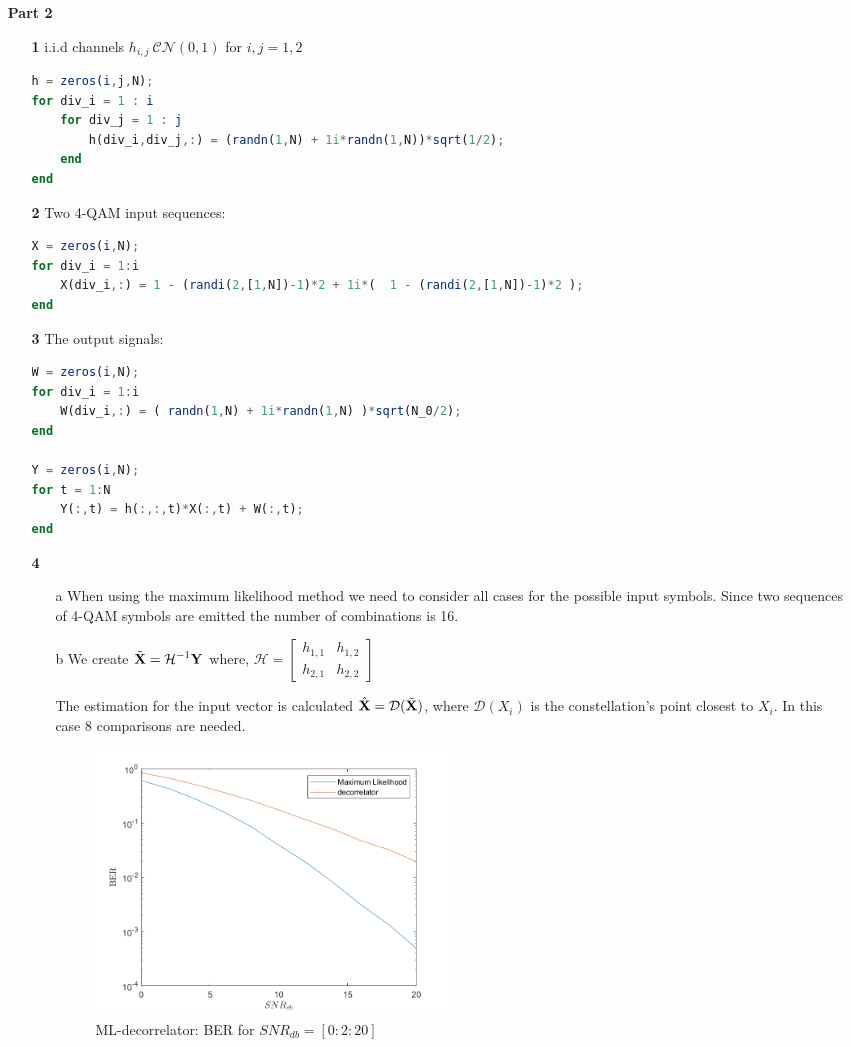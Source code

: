 \documentclass[12pt]{article}
\begin{document}
\begin{enumerate}
		\newpage
		\item[\bf Part 2]
		\begin{enumerate}
			\item[\bf 1]
			i.i.d channels $h_{i,j}~\mathcal{CN}(0,1)$ for $i,j=1,2$
			\begin{lstlisting}[language=octave]
h = zeros(i,j,N);
for div_i = 1 : i
	for div_j = 1 : j
		h(div_i,div_j,:) = (randn(1,N) + 1i*randn(1,N))*sqrt(1/2);
	end 
end
			\end{lstlisting}
			\item[\bf 2]
			Two 4-QAM input sequences:
			\begin{lstlisting}[language=octave]
X = zeros(i,N);
for div_i = 1:i
	X(div_i,:) = 1 - (randi(2,[1,N])-1)*2 + 1i*(  1 - (randi(2,[1,N])-1)*2 );
end
			\end{lstlisting}
			\item[\bf 3]
			The output signals:
			\begin{lstlisting}[language=octave]
W = zeros(i,N);
for div_i = 1:i
	W(div_i,:) = ( randn(1,N) + 1i*randn(1,N) )*sqrt(N_0/2);
end

Y = zeros(i,N);
for t = 1:N
	Y(:,t) = h(:,:,t)*X(:,t) + W(:,t);
end
			\end{lstlisting}
			\item[\bf 4]
			\begin{enumerate}
				\item[a] When using the maximum likelihood method we need to consider all cases for the possible input symbols. Since two sequences of 4-QAM symbols are emitted the number of combinations is 16.\\
				
				\item[b] We create $\displaystyle \tilde{\bf X}=\mathcal{H}^{-1}{\bf Y}$ where, $\displaystyle \mathcal{H} = \begin{bmatrix}
					h_{1,1} & h_{1,2}\\
					h_{2,1} & h_{2,2}
				\end{bmatrix}$
			
				The estimation for the input vector is calculated $\displaystyle \hat{\bf X}=\mathcal{D}(\tilde{\bf X})$, where $\mathcal{D}(X_i)$ is the constellation's point closest to $X_i$. In this case 8 comparisons are needed.
				\begin{figure}[h!]
					\centering
					\includegraphics[width=0.5\textwidth]{fig7.png}
					\caption{ML-decorrelator: BER for $SNR_{db}=[0:2:20]$}
				\end{figure}
			

\end{enumerate}
\end{enumerate}
\end{enumerate}
\end{document}
